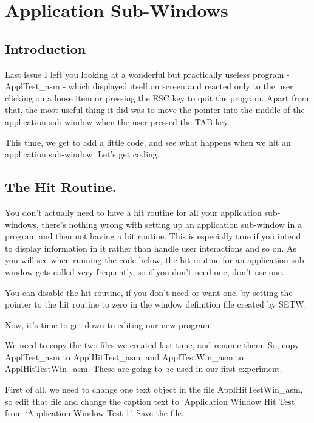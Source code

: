 \chapter{Application Sub-{}Windows}

\section{Introduction}
\label{ch28-intro}%

Last issue I left you looking at a wonderful but practically useless program - ApplTest\_asm - which displayed itself on screen and reacted only to the user clicking on a loose
        item or pressing the ESC key to quit the program. Apart from that, the most useful
        thing it did was to move the pointer into the middle of the application sub-{}window
        when the user pressed the TAB key.

This time, we get to add a little code, and see what happens when we hit an
        application sub-{}window. Let's get coding.

\section{The Hit Routine.}
\label{ch28-appl-hit}%

You don't actually need to have a hit routine for all your application
        sub-{}windows, there's nothing wrong with setting up an application sub-{}window in a
        program and then not having a hit routine. This is especially true if you intend
        to display information in it rather than handle user interactions and so on. As
        you will see when running the code below, the hit routine for an application
        sub-{}window gets called very frequently, so if you don't need one, don't use
        one.

You can disable the hit routine, if you don't need or want one, by setting
        the pointer to the hit routine to zero in the window definition file created by SETW. 
        
Now, it's time to get down to editing our new program.

We need to copy the two files we created last time, and rename them. So,
        copy ApplTest\_asm to ApplHitTest\_asm,
        and ApplTestWin\_asm to ApplHitTestWin\_asm. These are going to be used in our first
        experiment.

First of all, we need to change one text object in the file
 ApplHitTestWin\_asm, so edit that file and change the caption
        text to `Application Window Hit Test' from `Application Window Test 1'. Save the
        file.

